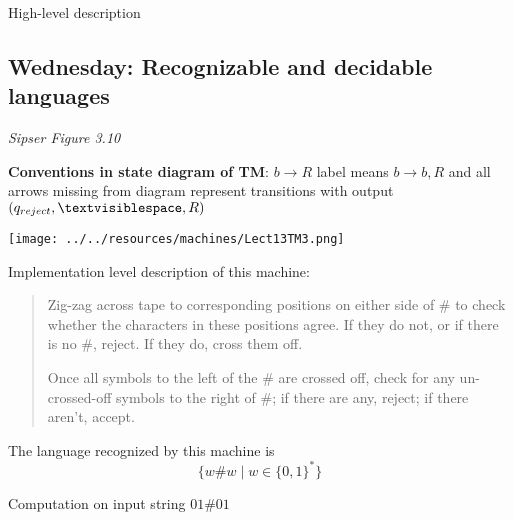 \documentclass[12pt, oneside]{article}
\begin{document}
\vfill

High-level description

\vfill

\newpage
     
\newpage
\subsection*{Wednesday: Recognizable and decidable languages}




{\it Sipser Figure  3.10}

{\bf Conventions in state diagram of TM}: $b \to R$ label means $b \to b, R$ and
all arrows missing from diagram represent transitions with output $(q_{reject}, \textvisiblespace , R)$

\begin{multicols}{2}
\vspace{-20pt}
\begin{center}
\texttt{[image: ../../resources/machines/Lect13TM3.png]}
\end{center}

Implementation level description of this machine:
\begin{quote}
Zig-zag across tape to corresponding positions on either side of $\#$ to check whether the 
characters in these positions agree. If they do not, or if there is no $\#$, reject. If they 
do, cross them off.

Once all symbols to the left of the $\#$ are crossed off, check for any un-crossed-off symbols 
to the right of $\#$; if there are any, reject; if there aren't, accept.
\end{quote}

The language recognized by this machine is
\[
  \{ w \# w \mid w \in \{0,1\}^* \}
\]

\columnbreak

Computation on  input  string  $01\#01$


\end{multicols}
\end{document}
